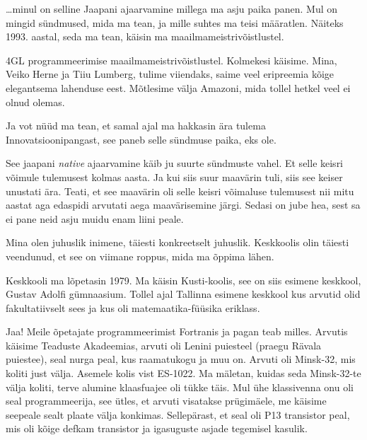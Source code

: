                  

\ldots minul on selline Jaapani ajaarvamine millega ma asju paika panen. Mul on 
mingid sündmused, mida ma tean, ja mille suhtes ma teisi määratlen. Näiteks 
1993. aastal, seda ma tean, käisin ma maailmameistrivõistlustel. 


4GL 
programmeerimise maailmameistrivõistlustel. Kolmekesi käisime. Mina, Veiko 
Herne ja Tiiu Lumberg,  
tulime viiendaks, saime veel eripreemia  kõige  elegantsema lahenduse eest. 
Mõtlesime välja Amazoni, mida tollel hetkel veel ei olnud olemas. 

Ja vot nüüd ma tean, et samal ajal ma hakkasin ära tulema 
Innovatsioonipangast, see paneb selle sündmuse 
paika, eks ole. 

See jaapani \emph{native} ajaarvamine käib ju suurte sündmuste vahel. Et selle 
keisri võimule tulemusest kolmas aasta. Ja kui siis suur maavärin tuli, siis 
see keiser unustati ära. Teati, et see maavärin oli selle keisri võimaluse 
tulemusest nii mitu aastat aga edaspidi arvutati aega maavärisemine järgi. 
Sedasi on jube hea, sest sa ei pane neid asju muidu enam liini peale.  


Mina olen juhuslik inimene, täiesti konkreetselt juhuslik. Keskkoolis olin 
täiesti veendunud, et see on viimane roppus, mida ma õppima lähen. 


Keskkooli ma lõpetasin 1979. Ma käisin Kusti-koolis, see on siis esimene 
keskkool, Gustav Adolfi gümnaasium. Tollel 
ajal Tallinna esimene keskkool kus arvutid olid fakultatiivselt sees ja kus oli 
matemaatika-füüsika eriklass. 


Jaa! Meile õpetajate programmeerimist Fortranis ja pagan 
teab milles. Arvutis käisime Teaduste Akadeemias, 
arvuti oli Lenini puiesteel (praegu Rävala puiestee), seal nurga peal, kus 
raamatukogu ja muu on. Arvuti oli Minsk-32, mis 
koliti just välja. Asemele kolis vist ES-1022. Ma 
mäletan, kuidas seda Minsk-32-te välja koliti,  terve alumine klaasfuajee oli 
tükke täis. Mul ühe klassivenna onu oli seal programmeerija, see ütles, et 
arvuti visatakse prügimäele, me käisime seepeale sealt plaate välja konkimas. 
Sellepärast, et seal oli P13 transistor peal, mis oli kõige defkam transistor 
ja igasuguste asjade tegemisel kasulik.

